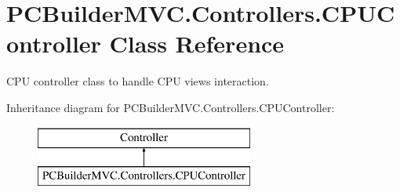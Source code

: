\hypertarget{class_p_c_builder_m_v_c_1_1_controllers_1_1_c_p_u_controller}{}\section{P\+C\+Builder\+M\+V\+C.\+Controllers.\+C\+P\+U\+Controller Class Reference}
\label{class_p_c_builder_m_v_c_1_1_controllers_1_1_c_p_u_controller}


C\+PU controller class to handle C\+PU views interaction.  


Inheritance diagram for P\+C\+Builder\+M\+V\+C.\+Controllers.\+C\+P\+U\+Controller\+:\begin{figure}[H]
\begin{center}
\leavevmode
\includegraphics[height=2.000000cm]{class_p_c_builder_m_v_c_1_1_controllers_1_1_c_p_u_controller}
\end{center}
\end{figure}
